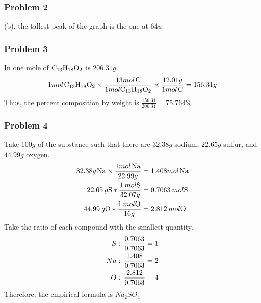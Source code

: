 \documentclass{article}
\begin{document}
\subsubsection*{Problem 2}
(b), the tallest peak of the graph is the one at \(64u\). 
\subsubsection*{Problem 3}
In one mole of \(\ce{C_{13}H_{18}O_2}\) is \(206.31g\).
\begin{equation}
\begin{aligned}
    1mol\hspace{0.1em}\ce{C_{13}H_{18}O_2} \times \frac{13mol\hspace{0.1em}\ce{C}}{1mol\ce{C_{13}H_{18}O_2}} \times \frac{12.01g}{1mol\hspace{0.1em}\ce{C}} = 156.31g
\end{aligned}
\end{equation}
Thus, the percent composition by weight is \(\frac{156.31}{206.31} = 75.764\%\)
\subsubsection*{Problem 4}
Take \(100g\) of the substance such that there are \(32.38g\) sodium, \(22.65g\) sulfur, and \(44.99g\) oxygen. 
\begin{equation}
\begin{aligned}
    32.38g\hspace{0.1em}\ce{Na} \times \frac{1mol\hspace{0.1em}\ce{Na}}{22.99g} &= 1.408mol\hspace{0.1em}\ce{Na} \\
    22.65\hspace{0.2em}g \ce{S} * \frac{1\hspace{0.2em}mol\ce{S}}{32.07g} &= 0.7063 \hspace{0.2em}mol\ce{S}\\
    44.99\hspace{0.2em}g\ce{O} * \frac{1\hspace{0.2em}mol\ce{O}}{16 g} &= 2.812\hspace{0.2em}mol \ce{O}
\end{aligned}
\end{equation}
Take the ratio of each compound with the smallest quantity. 
\begin{equation}
\begin{split}
    S:\hspace{0.2em}\frac{0.7063}{0.7063} = 1 \\
    Na:\hspace{0.2em}\frac{1.408}{0.7063} = 2 \\
    O:\hspace{0.2em}\frac{2.812}{0.7063} = 4
\end{split}
\end{equation}
Therefore, the empirical formula is \(Na_{2}SO_{4}\)
\end{document}
